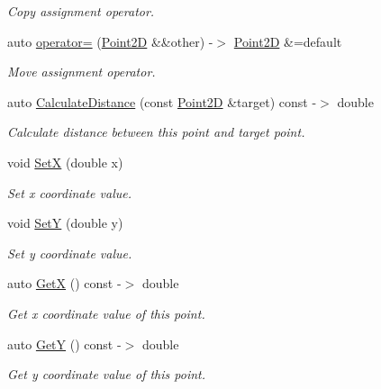 \begin{DoxyCompactItemize}
\begin{DoxyCompactList}\small\item\em Copy assignment operator. \end{DoxyCompactList}\item 
auto \hyperlink{classprogrammers_1_1geometry_1_1Point2D_ac5ceadc06a745b1189fceff65eda53b0}{operator=} (\hyperlink{classprogrammers_1_1geometry_1_1Point2D}{Point2D} \&\&other) -\/$>$ \hyperlink{classprogrammers_1_1geometry_1_1Point2D}{Point2D} \&=default
\begin{DoxyCompactList}\small\item\em Move assignment operator. \end{DoxyCompactList}\item 
auto \hyperlink{classprogrammers_1_1geometry_1_1Point2D_a724e8f68efe2a33069335a8401ecfc70}{Calculate\+Distance} (const \hyperlink{classprogrammers_1_1geometry_1_1Point2D}{Point2D} \&target) const -\/$>$ double
\begin{DoxyCompactList}\small\item\em Calculate distance between this point and target point. \end{DoxyCompactList}\item 
void \hyperlink{classprogrammers_1_1geometry_1_1Point2D_a1bf5f23afe2acf9056a214d0b2a22c8b}{SetX} (double x)
\begin{DoxyCompactList}\small\item\em Set x coordinate value. \end{DoxyCompactList}\item 
void \hyperlink{classprogrammers_1_1geometry_1_1Point2D_a68ed3a3ad874d10ec4a8297eeda2b6bd}{SetY} (double y)
\begin{DoxyCompactList}\small\item\em Set y coordinate value. \end{DoxyCompactList}\item 
auto \hyperlink{classprogrammers_1_1geometry_1_1Point2D_a41fbc656ae357f7fe365ed5b6eba5eb1}{GetX} () const -\/$>$ double
\begin{DoxyCompactList}\small\item\em Get x coordinate value of this point. \end{DoxyCompactList}\item 
auto \hyperlink{classprogrammers_1_1geometry_1_1Point2D_a28ade425318accb547519a066342dd47}{GetY} () const -\/$>$ double
\begin{DoxyCompactList}\small\item\em Get y coordinate value of this point. \end{DoxyCompactList}\item 

\end{DoxyCompactItemize}
